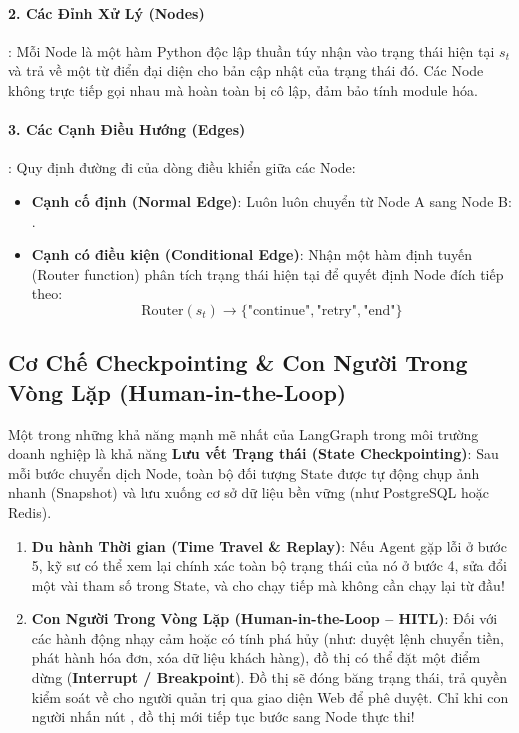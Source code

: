 \paragraph{2. Các Đỉnh Xử Lý (Nodes)}:
Mỗi Node là một hàm Python độc lập thuần túy nhận vào trạng thái hiện tại $s_t$ và trả về một từ điển đại diện cho bản cập nhật của trạng thái đó. Các Node không trực tiếp gọi nhau mà hoàn toàn bị cô lập, đảm bảo tính module hóa.

\paragraph{3. Các Cạnh Điều Hướng (Edges)}:
Quy định đường đi của dòng điều khiển giữa các Node:
\begin{itemize}
  \item \textbf{Cạnh cố định (Normal Edge)}: Luôn luôn chuyển từ Node A sang Node B: .
  \item \textbf{Cạnh có điều kiện (Conditional Edge)}: Nhận một hàm định tuyến (Router function) phân tích trạng thái hiện tại để quyết định Node đích tiếp theo:
  \begin{equation}
  \text{Router}(s_t) \to \{\text{"continue"}, \text{"retry"}, \text{"end"}\}
  \end{equation}
\end{itemize}

\subsection{Cơ Chế Checkpointing \& Con Người Trong Vòng Lặp (Human-in-the-Loop)}
Một trong những khả năng mạnh mẽ nhất của LangGraph trong môi trường doanh nghiệp là khả năng \textbf{Lưu vết Trạng thái (State Checkpointing)}:
Sau mỗi bước chuyển dịch Node, toàn bộ đối tượng State được tự động chụp ảnh nhanh (Snapshot) và lưu xuống cơ sở dữ liệu bền vững (như PostgreSQL hoặc Redis).
\begin{enumerate}
  \item \textbf{Du hành Thời gian (Time Travel \& Replay)}: Nếu Agent gặp lỗi ở bước 5, kỹ sư có thể xem lại chính xác toàn bộ trạng thái của nó ở bước 4, sửa đổi một vài tham số trong State, và cho chạy tiếp mà không cần chạy lại từ đầu!
  \item \textbf{Con Người Trong Vòng Lặp (Human-in-the-Loop -- HITL)}: Đối với các hành động nhạy cảm hoặc có tính phá hủy (như: duyệt lệnh chuyển tiền, phát hành hóa đơn, xóa dữ liệu khách hàng), đồ thị có thể đặt một điểm dừng (\textbf{Interrupt / Breakpoint}). Đồ thị sẽ đóng băng trạng thái, trả quyền kiểm soát về cho người quản trị qua giao diện Web để phê duyệt. Chỉ khi con người nhấn nút , đồ thị mới tiếp tục bước sang Node thực thi!
\end{enumerate}

